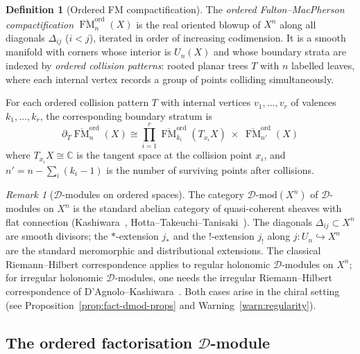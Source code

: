 \documentclass[11pt,reqno]{amsart}
\theoremstyle{definition}
\newtheorem{definition}[theorem]{Definition}
\theoremstyle{remark}
\newtheorem{remark}[theorem]{Remark}
\newcommand{\cD}{\mathcal{D}}
\DeclareMathOperator{\FM}{FM}
\newcommand{\CC}{\mathbb{C}}
\numberwithin{equation}{section}
\begin{document}
\begin{definition}[Ordered FM compactification]
\label{def:ord-fm}
The \emph{ordered Fulton--MacPherson compactification}
$\overline{\FM}_n^{\mathrm{ord}}(X)$ is the real oriented
blowup of $X^n$ along all diagonals $\Delta_{ij}$
($i < j$), iterated in order of increasing codimension.
It is a smooth manifold with corners whose interior is
$U_n(X)$ and whose boundary strata are indexed by
\emph{ordered collision patterns}: rooted planar trees
$T$ with $n$ labelled leaves, where each internal vertex
records a group of points colliding simultaneously.

For each ordered collision pattern $T$ with internal
vertices $v_1, \ldots, v_r$ of valences $k_1, \ldots, k_r$,
the corresponding boundary stratum is
\begin{equation}\label{eq:fm-stratum}
  \partial_T \overline{\FM}_n^{\mathrm{ord}}(X)
  \cong
  \prod_{i=1}^r
  \overline{\FM}_{k_i}^{\mathrm{ord}}(T_{x_i} X)
  \;\times\;
  \overline{\FM}_{n'}^{\mathrm{ord}}(X)
\end{equation}
where $T_{x_i} X \cong \CC$ is the tangent space at the
collision point $x_i$, and $n' = n - \sum_i (k_i - 1)$ is
the number of surviving points after collisions.
\end{definition}

\begin{remark}[$\cD$-modules on ordered spaces]
\label{rem:dmod-standard}
The category $\cD\text{-}\mathrm{mod}(X^n)$ of
$\cD$-modules on $X^n$ is the standard abelian category of
quasi-coherent sheaves with flat connection
(Kashiwara~\cite{Kashiwara03},
Hotta--Takeuchi--Tanisaki~\cite{HTT08}).
The diagonals $\Delta_{ij} \subset X^n$ are smooth
divisors; the $*$-extension $j_*$ and the $!$-extension
$j_!$ along $j \colon U_n \hookrightarrow X^n$ are the
standard meromorphic and distributional extensions.
The classical Riemann--Hilbert correspondence applies
to regular holonomic $\cD$-modules on $X^n$; for
irregular holonomic $\cD$-modules, one needs the
irregular Riemann--Hilbert correspondence of
D'Agnolo--Kashiwara~\cite{DAgnoloKashiwara16}.
Both cases arise in the chiral setting
(see Proposition~\ref{prop:fact-dmod-props} and
Warning~\ref{warn:regularity}).
\end{remark}


\subsection{The ordered factorisation $\cD$-module}
\label{subsec:fact-dmod}
\end{document}
